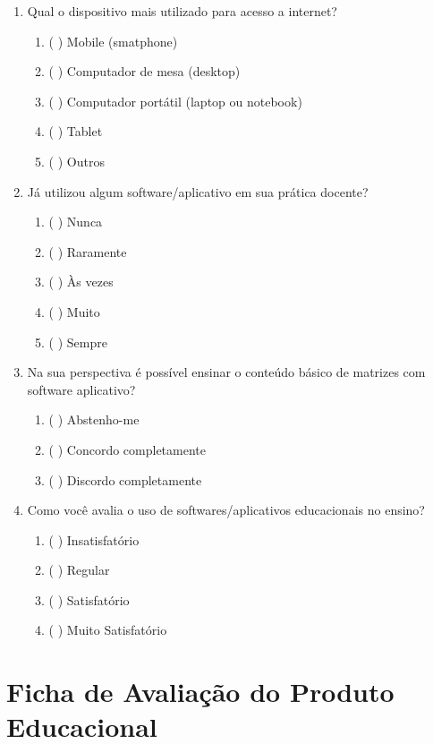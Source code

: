 \begin{apendicesenv}
\begin{enumerate}
    \item Qual o dispositivo mais utilizado para acesso a internet?
    \begin{enumerate}
        \item ( ) Mobile (smatphone)
        \item ( ) Computador de mesa (desktop)
        \item ( ) Computador portátil (laptop ou notebook)
        \item ( ) Tablet
        \item ( ) Outros
    \end{enumerate}


    \item Já utilizou algum software/aplicativo em sua prática docente?
    \begin{enumerate}
        \item ( ) Nunca
        \item ( ) Raramente
        \item ( ) Às vezes
        \item ( ) Muito
        \item ( ) Sempre
    \end{enumerate}


    \item Na sua perspectiva é possível ensinar o conteúdo básico de matrizes com software aplicativo?
    \begin{enumerate}
        \item ( ) Abstenho-me
        \item ( ) Concordo completamente
        \item ( ) Discordo completamente
    \end{enumerate}


    \item Como você avalia o uso de softwares/aplicativos educacionais no ensino?
    \begin{enumerate}
        \item ( ) Insatisfatório
        \item ( ) Regular
        \item ( ) Satisfatório
        \item ( ) Muito Satisfatório
    \end{enumerate}
    
    
\end{enumerate}






\chapter{Ficha de Avaliação do Produto Educacional}


\end{apendicesenv}

